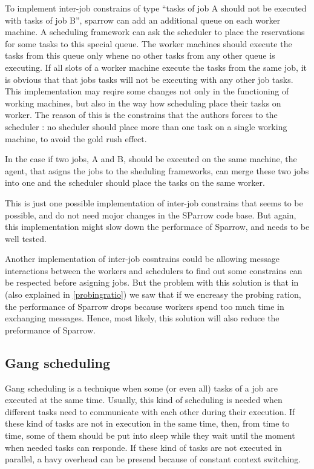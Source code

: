 \documentclass[11pt]{article}
\begin{document}
		To implement inter-job constrains of type ``tasks of job A should not be executed with tasks of job B'', sparrow can add an additional queue on each worker machine. A scheduling framework can ask the scheduler to place the reservations for some tasks to this special queue. The worker machines should execute the tasks from this queue only whene no other tasks from any other queue is executing. If all slots of a worker machine execute the tasks from the same job, it is obvious that that jobs tasks will not be executing with any other job tasks. This implementation may reqire some changes not only in the functioning of working machines, but also in the way how scheduling place their tasks on worker. The reason of this is the constrains that the authors forces to the scheduler \cite[section 5]{sparrow}: no sheduler should place more than one task on a single working machine, to avoid the gold rush effect.
		
		In the case if two jobs, A and B, should be executed on the same machine, the agent, that asigns the jobs to the sheduling frameworks, can merge these two jobs into one and the scheduler should place the tasks on the same worker.
		
		This is just one possible implementation of inter-job constrains that seems to be possible, and do not need mojor changes in the SParrow code base. But again, this implementation might slow down the performace of Sparrow, and needs to be well tested.
		
		Another implementation of inter-job cosntrains could be allowing message interactions between the workers and schedulers to find out some constrains can be respected before asigning jobs. But the problem with this solution is that in \cite[subsection 7.9]{sparrow} (also explained in \ref{probingratio}) we saw that if we encreasy the probing ration, the performance of Sparrow drops because workers spend too much time in exchanging messages. Hence, most likely, this solution will also reduce the preformance of Sparrow.

	\subsection{Gang scheduling}
		\label{gang}
	
		Gang scheduling is a technique when some (or even all) tasks of a job are executed at the same time. Usually, this kind of scheduling is needed when different tasks need to communicate with each other during their execution. If these kind of tasks are not in execution in the same time, then, from time to time, some of them should be put into sleep while they wait until the moment when needed tasks can responde. If these kind of tasks are not executed in parallel, a havy overhead can be presend because of constant context switching.
		
\end{document}
